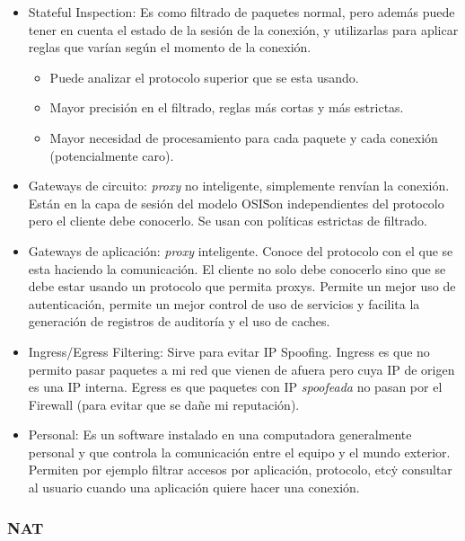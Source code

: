\begin{itemize}
\begin{itemize}
\begin{itemize}
			\end{itemize}
			\item Stateful Inspection: Es como filtrado de paquetes normal, pero además puede tener en cuenta el estado de la sesión
			de la conexión, y utilizarlas para aplicar reglas que varían según el momento de la conexión. 
			\begin{itemize}
				\item Puede analizar el protocolo superior que se esta usando.
				\item Mayor precisión en el filtrado, reglas más cortas y más estrictas.
				\item Mayor necesidad de procesamiento para cada paquete y cada conexión (potencialmente caro).
			\end{itemize}
			\item Gateways de circuito: \textit{proxy} no inteligente, simplemente renvían la conexión. Están en la capa de sesión del 
			modelo OSI\. Son independientes del protocolo pero el cliente debe conocerlo. Se usan con políticas estrictas de filtrado.
			\item Gateways de aplicación: \textit{proxy} inteligente. Conoce del protocolo con el que se esta haciendo la comunicación. El
			cliente no solo debe conocerlo sino que se debe estar usando un protocolo que permita proxys. Permite un mejor uso de autenticación,
			permite un mejor control de uso de servicios y facilita la generación de registros de auditoría y el uso de caches.
			\item Ingress/Egress Filtering: Sirve para evitar IP Spoofing. Ingress es que no permito pasar paquetes a mi red que vienen de afuera pero 
			cuya IP de origen es una IP interna. Egress es que paquetes con IP \textit{spoofeada} no pasan por el Firewall (para evitar que se
			dañe mi reputación).
			\item Personal: Es un software instalado en una computadora generalmente personal y que controla la comunicación entre el equipo y
			el mundo exterior. Permiten por ejemplo filtrar accesos por aplicación, protocolo, etc\. y consultar al usuario cuando una aplicación
			quiere hacer una conexión.
		\end{itemize}
\end{itemize}

\subsubsection{NAT}


